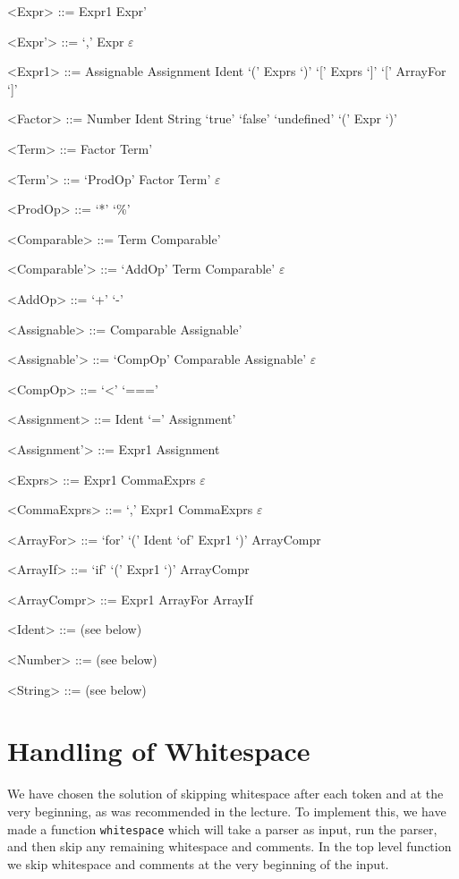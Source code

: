 \documentclass{article}
\begin{document}
\begin{grammar}
	\let\syntleft\relax
	\let\syntright\relax
	
	<Expr> ::= Expr1 Expr'
	
	<Expr'> ::= `,' Expr
	\alt $\varepsilon$

	<Expr1> ::= Assignable
	\alt Assignment
	\alt Ident `(' Exprs `)'
	\alt `[' Exprs `]'
	\alt `[' ArrayFor `]'
		
	<Factor> ::= Number
	\alt Ident
	\alt String
	\alt `true'
	\alt `false'
	\alt `undefined'
	\alt `(' Expr `)'
	
	<Term> ::= Factor Term'
	
	<Term'> ::= `ProdOp' Factor Term'
	\alt $\varepsilon$
	
	<ProdOp> ::= `*'
	\alt `\%'
	
	<Comparable> ::= Term Comparable'
	
	<Comparable'> ::= `AddOp' Term Comparable'
	\alt $\varepsilon$
	
	<AddOp> ::= `+'
	\alt `-'
	
	<Assignable> ::= Comparable Assignable'
	
	<Assignable'> ::= `CompOp' Comparable Assignable'
	\alt $\varepsilon$
	
	
	<CompOp> ::= `<'
	\alt `==='
	
	<Assignment> ::= Ident `=' Assignment'
	
	<Assignment'> ::= Expr1
	\alt Assignment
	
	<Exprs> ::= Expr1 CommaExprs
	\alt $\varepsilon$	
	
	<CommaExprs> ::= `,' Expr1 CommaExprs
	\alt $\varepsilon$
	
	<ArrayFor> ::= `for' `(' Ident `of' Expr1 `)' ArrayCompr
	
	<ArrayIf> ::= `if' `(' Expr1 `)' ArrayCompr
	
	<ArrayCompr> ::= Expr1
	\alt ArrayFor
	\alt ArrayIf
	
	<Ident> ::= (see below)
	
	<Number> ::= (see below)
	
	<String> ::= (see below)
\end{grammar}


\section{Handling of Whitespace}
We have chosen the solution of skipping whitespace after each token and at the very beginning, as was recommended in the lecture. To implement this, we have made a function \texttt{whitespace} which will take a parser as input, run the parser, and then skip any remaining whitespace and comments. In the top level function we skip whitespace and comments at the very beginning of the input.
\end{document}
